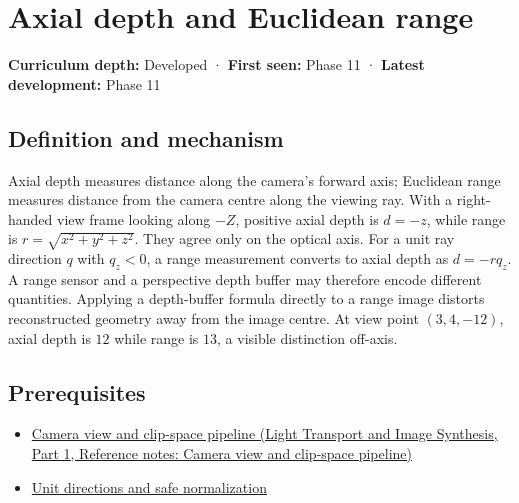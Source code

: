 \hypertarget{appendix-cac01ebeeb11}{}\label{referencestart:appendix-cac01ebeeb11}
\section{Axial depth and Euclidean range}\label{appendix-cac01ebeeb11-axial-depth-and-euclidean-range}

\hypertarget{appendix-cac01ebeeb11-axial-depth-and-euclidean-range}{}

\textbf{Curriculum depth:} Developed · \textbf{First seen:} Phase 11 · \textbf{Latest development:} Phase 11

\begin{allmightroledefinition}

\subsection{Definition and mechanism}\label{appendix-cac01ebeeb11-definition-and-mechanism}

\hypertarget{appendix-cac01ebeeb11-definition-and-mechanism}{}

Axial depth measures distance along the camera's forward axis; Euclidean range measures distance from the camera centre along the viewing ray. With a right-handed view frame looking along \(-Z\), positive axial depth is \(d=-z\), while range is \(r=\sqrt{x^2+y^2+z^2}\). They agree only on the optical axis. For a unit ray direction \(q\) with \(q_z<0\), a range measurement converts to axial depth as \(d=-rq_z\). A range sensor and a perspective depth buffer may therefore encode different quantities. Applying a depth-buffer formula directly to a range image distorts reconstructed geometry away from the image centre. At view point \((3,4,-12)\), axial depth is \(12\) while range is \(13\), a visible distinction off-axis.

\end{allmightroledefinition}

\subsection{Prerequisites}\label{appendix-cac01ebeeb11-prerequisites}

\hypertarget{appendix-cac01ebeeb11-prerequisites}{}

\begin{itemize}
\tightlist
\item
  \href{../04-Light-Transport-and-Image-Synthesis-P01/main.pdf\#appendix-1c07d64f5e70}{Camera view and clip-space pipeline (Light Transport and Image Synthesis, Part 1, Reference notes: Camera view and clip-space pipeline)}
\item
  \hyperref[appendix-f744e41b95b4]{Unit directions and safe normalization}
\end{itemize}

